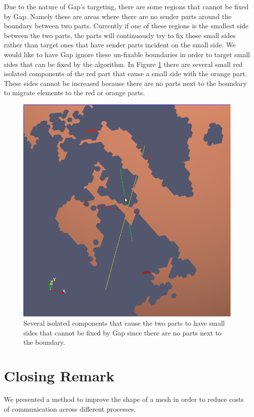 \documentclass{thesis}
\begin{document}
Due to the nature of Gap's targeting, there are some regions that cannot be 
fixed by Gap. Namely these are areas where there are no sender parts around 
the boundary between two parts. Currently if one of these regions is the 
smallest side between the two parts, the parts will continuously try to fix 
those small sides rather than target ones that have sender parts incident on 
the small side. We would like to have Gap ignore these un-fixable boundaries 
in order to target small sides that can be fixed by the algorithm. In Figure 
\ref{fig:ocean} there are several small red isolated components of the red 
part that cause a small side with the orange part. These sides cannot be 
increased because there are no parts next to the boundary to migrate elements 
to the red or orange parts.

\begin{figure} [!ht]
\centering
\captionsetup{justification=centering,margin=1cm}
\includegraphics[width=.7\textwidth]{Ocean_Isolated.png}
\caption{\label{fig:ocean} \textnormal{Several isolated components that cause the two parts to have small sides that cannot be fixed by Gap since there are no parts next to the boundary.}}
\end{figure}




\chapter{Closing Remark}

We presented a method to improve the shape of a mesh in order to reduce costs of communication across different processes.




\end{document}
